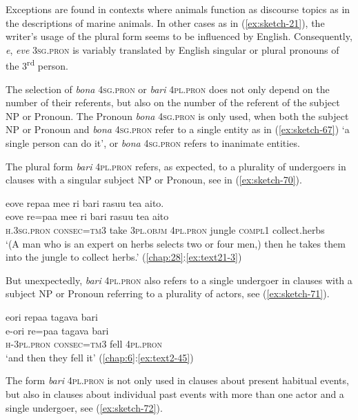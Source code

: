 \documentclass[output=paper]{langscibook}
\begin{document}
Exceptions are found in contexts where animals function as discourse topics as in the descriptions of marine animals. In other cases as in (\ref{ex:sketch-21}), the writer's usage of the plural form seems to be influenced by English. Consequently, \textit{e}, \textit{eve} \textsc{3sg}.\textsc{pron} is variably translated by English singular or plural pronouns of the 3\textsuperscript{rd} person.

The selection of \textit{bona} 4\textsc{sg}.\textsc{pron} or \textit{bari} 4\textsc{pl}.\textsc{pron} does not only depend on the number of their referents, but also on the number of the referent of the subject NP or Pronoun. The Pronoun \textit{bona} 4\textsc{sg}.\textsc{pron} is only used, when both the subject NP or Pronoun and \textit{bona}  4\textsc{sg}.\textsc{pron} refer to a single entity as in (\ref{ex:sketch-67}) `a single person can do it', or \textit{bona}  4\textsc{sg}.\textsc{pron} refers to inanimate entities.

The plural form \textit{bari} 4\textsc{pl}.\textsc{pron} refers, as expected, to a plurality of undergoers in clauses with a singular subject NP or Pronoun, see in (\ref{ex:sketch-70}).

\ea\label{ex:sketch-70}
    eove repaa mee ri bari rasuu tea aito.\\
    \gll eove	re=paa	mee	ri	bari	rasuu	tea	aito\\
    \textsc{h}.3\textsc{sg}.\textsc{pron}	\textsc{consec}=\textsc{tm}3	take	3\textsc{pl}.\textsc{objm}	4\textsc{pl}.\textsc{pron}	jungle	\textsc{compl}1	collect.herbs\\
    \glt `(A man who is an expert on herbs selects two or four men,) then he takes them into the jungle to collect herbs.' (\ref{chap:28}:\ref{ex:text21-3})
\z

But unexpectedly, \textit{bari} 4\textsc{pl}.\textsc{pron} also refers to a single undergoer in clauses with a subject NP or Pronoun referring to a plurality of actors, see (\ref{ex:sketch-71}).

\ea\label{ex:sketch-71}
    eori repaa tagava bari\\
    \gll e-ori	re=paa	tagava	bari\\
    \textsc{h}-3\textsc{pl}.\textsc{pron}	\textsc{consec}=\textsc{tm}3	fell	4\textsc{pl}.\textsc{pron}\\
    \glt `and then they fell it' (\ref{chap:6}:\ref{ex:text2-45})
\z

The form \textit{bari} 4\textsc{pl}.\textsc{pron} is not only used in clauses about present habitual events, but also in clauses about individual past events with more than one actor and a single undergoer, see (\ref{ex:sketch-72}).
\end{document}
